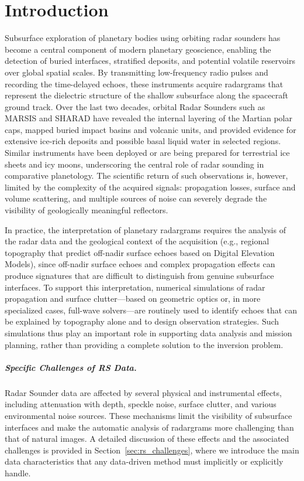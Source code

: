 \chapter{Introduction}
\label{cha:intro}
Subsurface exploration of planetary bodies using orbiting radar sounders has become a central component of modern planetary geoscience, enabling the detection of buried interfaces, stratified deposits, and potential volatile reservoirs over global spatial scales.
By transmitting low-frequency radio pulses and recording the time-delayed echoes, these instruments acquire radargrams that represent the dielectric structure of the shallow subsurface along the spacecraft ground track.
Over the last two decades, orbital Radar Sounders such as MARSIS and SHARAD have revealed the internal layering of the Martian polar caps, mapped buried impact basins and volcanic units, and provided evidence for extensive ice-rich deposits and possible basal liquid water in selected regions.
Similar instruments have been deployed or are being prepared for terrestrial ice sheets and icy moons, underscoring the central role of radar sounding in comparative planetology.
The scientific return of such observations is, however, limited by the complexity of the acquired signals: propagation losses, surface and volume scattering, and multiple sources of noise can severely degrade the visibility of geologically meaningful reflectors.

In practice, the interpretation of planetary radargrams requires the analysis of the radar data and the geological context of the acquisition (e.g., regional topography that predict off-nadir surface echoes based on Digital Elevation Models), since off-nadir surface echoes and complex propagation effects can produce signatures that are difficult to distinguish from genuine subsurface interfaces.
To support this interpretation, numerical simulations of radar propagation and surface clutter—based on geometric optics or, in more specialized cases, full-wave solvers—are routinely used to identify echoes that can be explained by topography alone and to design observation strategies.
Such simulations thus play an important role in supporting data analysis and mission planning, rather than providing a complete solution to the inversion problem.

\paragraph{Specific Challenges of RS Data.}
Radar Sounder data are affected by several physical and instrumental effects, including attenuation with depth, speckle noise, surface clutter, and various environmental noise sources.
These mechanisms  limit the visibility of  subsurface interfaces and make the automatic analysis of radargrams more challenging than that of natural images.
A detailed discussion of these effects and the associated challenges is provided in Section~\ref{sec:rs_challenges}, where we introduce the main data characteristics that any data-driven method must implicitly or explicitly handle.

